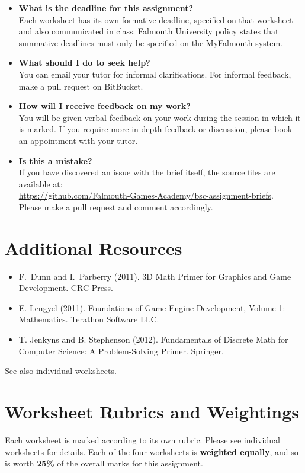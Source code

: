 \documentclass{../../fal_assignment}
\begin{document}
\begin{itemize}
	\item 	\textbf{What is the deadline for this assignment?} \\ 
			Each worksheet has its own formative deadline, specified on that worksheet and also communicated in class.
    		Falmouth University policy states that summative deadlines must only be specified on the MyFalmouth system.
    		
	\item 	\textbf{What should I do to seek help?} \\ 
    		You can email your tutor for informal clarifications. For informal feedback, make a pull request on BitBucket. 
    		
	\item 	\textbf{How will I receive feedback on my work?} \\ 
    		You will be given verbal feedback on your work during the session in which it is marked.
    		If you require more in-depth feedback or discussion, please book an appointment with your tutor.
    		
    	\item 	\textbf{Is this a mistake?} \\ 	
    		If you have discovered an issue with the brief itself, the source files are available at: \\
    		\url{https://github.com/Falmouth-Games-Academy/bsc-assignment-briefs}.\\
    		 Please make a pull request and comment accordingly.
\end{itemize}

\section*{Additional Resources}

\begin{itemize}
    \item F.\ Dunn and I.\ Parberry (2011). 3D Math Primer for Graphics and Game Development. CRC Press.
    \item E. Lengyel (2011). Foundations of Game Engine Development, Volume 1: Mathematics. Terathon Software LLC.
    \item T. Jenkyns and B. Stephenson (2012). Fundamentals of Discrete Math for Computer Science: A Problem-Solving Primer. Springer.
\end{itemize}

See also individual worksheets.

\section*{Worksheet Rubrics and Weightings}

Each worksheet is marked according to its own rubric. Please see individual worksheets for details. Each of the four worksheets is \textbf{weighted equally}, and so is worth \textbf{25\%} of the overall marks for this assignment.
\end{document}
